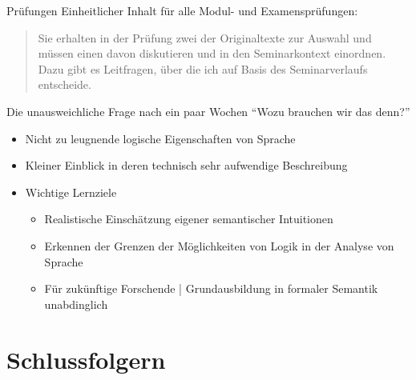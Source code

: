 \begin{frame}
  {Prüfungen}
  \onslide<+->
  \onslide<+->
  Einheitlicher Inhalt für alle Modul- und Examensprüfungen:\\
  \Zeile
  \begin{quote}
    Sie erhalten in der Prüfung zwei der Originaltexte zur Auswahl und müssen einen davon diskutieren und in den Seminarkontext einordnen. Dazu gibt es Leitfragen, über die ich auf Basis des Seminarverlaufs entscheide.
  \end{quote}
  \Zeile
  \onslide<+->
\end{frame}

\begin{frame}
  {Die unausweichliche Frage nach ein paar Wochen }
  \onslide<+->
  \onslide<+->
  \onslide<+->
  "`Wozu brauchen wir das denn?"'\\
  \Halbzeile
  \begin{itemize}[<+->]
    \item Nicht zu leugnende \alert{logische Eigenschaften von Sprache}
    \item Kleiner Einblick in deren \alert{technisch sehr aufwendige Beschreibung}
      \Halbzeile
    \item Wichtige Lernziele
      \begin{itemize}[<+->]
        \item Realistische Einschätzung \alert{eigener semantischer Intuitionen}
        \item Erkennen der \alert{Grenzen der Möglichkeiten von Logik} in der Analyse von Sprache
        \item Für zukünftige Forschende | \alert{Grundausbildung in formaler Semantik unabdinglich}
      \end{itemize}
  \end{itemize}
\end{frame}

\section{Schlussfolgern}

